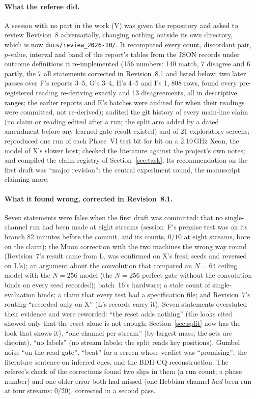 \documentclass[11pt]{article}
\begin{document}
\paragraph{What the referee did.} A session with no part in the work (V) was given the repository and asked to review Revision~8 adversarially, changing nothing outside its own directory, which is now \texttt{docs/review\_2026-10/}. It recomputed every count, discordant pair, $p$-value, interval and band of the report's tables from the JSON records under outcome definitions it re-implemented (156 numbers: 140 match, 7 disagree and 6 partly, the 7 all statements corrected in Revision~8.1 and listed below; two later passes over F's reports 3--5, G's 3--4, H's 4--5 and I's 1, 808 rows, found every pre-registered reading re-deriving exactly and 13 disagreements, all in descriptive ranges; the earlier reports and E's batches were audited for when their readings were committed, not re-derived); audited the git history of every main-line claim (no claim or reading edited after a run; the split arm added by a dated amendment before any learned-gate result existed) and of 21 exploratory screens; reproduced one run of each Phase~VI test bit for bit on a 2.10\,GHz Xeon, the model of X's slower host; checked the literature against the project's own notes; and compiled the claim registry of Section~\ref{sec:task}. Its recommendation on the first draft was ``major revision'': the central experiment sound, the manuscript claiming more.

\paragraph{What it found wrong, corrected in Revision~8.1.} Seven statements were false when the first draft was committed: that no single-channel run had been made at eight streams (session~F's premise test was on its branch 82 minutes before the commit, and its counts, $0/10$ at eight streams, bore on the claim); the Muon correction with the two machines the wrong way round (Revision~7's result came from L, was confirmed on X's fresh seeds and reversed on L's); an argument about the convolution that compared an $N = 64$ ceiling model with the $N = 256$ model (the $N = 256$ perfect gate without the convolution binds on every seed recorded); batch~16's hardware; a stale count of single-evaluation binds; a claim that every test had a specification file; and Revision~7's routing ``recorded only on X'' (L's records carry it). Seven statements overstated their evidence and were reworded: ``the reset adds nothing'' (the looks cited showed only that the reset alone is not enough; Section~\ref{sec:split} now has the look that shows it), ``one channel per stream'' (by largest mass; the sets are disjoint), ``no labels'' (no stream labels; the split reads key positions), Gumbel noise ``on the read gate'', ``beat'' for a screen whose verdict was ``promising'', the literature sentence on inferred cues, and the BDH-CQ reconstruction. The referee's check of the corrections found two slips in them (a run count; a phase number) and one older error both had missed (one Hebbian channel \emph{had} been run at four streams: $0/20$), corrected in a second pass.
\end{document}
